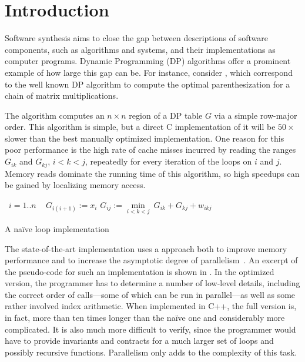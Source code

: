 \section{Introduction}
\label{intro}

\newcommand\ForLine[1]{\State\algorithmicfor~{#1} \algorithmicdo~}
\newcommand\Head[1]{\Comment{ {\it #1} ~~}}

Software synthesis aims to close the gap between descriptions of software components, such as algorithms and systems, and their implementations as computer programs. Dynamic Programming (DP) algorithms offer a prominent example of how large this gap can be. For instance, consider  
, which correspond to the well known DP algorithm to compute the optimal parenthesization for a chain of matrix multiplications. 

The algorithm computes an $n\times n$ region of a DP table $G$ via a simple row-major order. This algorithm is simple, but a direct C implementation of it will be 
$50\times$ slower than the best manually optimized implementation. 
One reason for this poor performance is the high rate of cache misses incurred by reading the ranges $G_{ik}$ and $G_{kj}$, $i<k<j$, repeatedly for every iteration of the loops on $i$ and $j$. Memory reads dominate the running time of this algorithm, so high speedups can be gained by localizing memory access.


\begin{algorithm}[t]
\renewcommand\arraystretch{1.3}
\begin{algorithmic}
  \ForLine{$i=1..n$}  $G_{i(i+1)} := x_i$    \Head{Initialize}
            \Head{Compute}
      \State $G_{ij} := \underset{i<k<j}\min ~ G_{ik} + G_{kj} + w_{ikj}$
    \EndFor
  \EndFor
\end{algorithmic}
\caption{\label{intro:naive}
   A na\"ive loop implementation}
\end{algorithm}


The state-of-the-art implementation uses a  approach both to improve memory performance and to increase the asymptotic degree of parallelism~\cite{IPDPS15/Tithi}. An excerpt of the pseudo-code for such an implementation is shown in . In the optimized version, the programmer has to determine a number of low-level details, including the correct order of calls---some of which can be run in parallel---as well as some rather involved index arithmetic. When implemented in C++, the full version is, in fact, more than ten times longer than the na\"ive one and considerably more complicated. It is also much more difficult to verify, since the programmer would have to provide invariants and contracts for a much larger set of loops and possibly recursive functions. Parallelism only adds to the complexity of this task.




